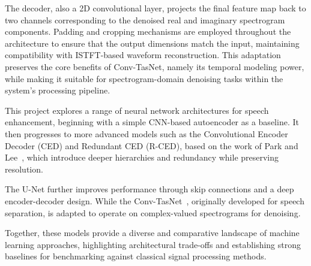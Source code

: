 The decoder, also a 2D convolutional layer, projects the final feature map back to two channels corresponding to the denoised real and imaginary spectrogram components. Padding and cropping mechanisms are employed throughout the architecture to ensure that the output dimensions match the input, maintaining compatibility with ISTFT-based waveform reconstruction. This adaptation preserves the core benefits of Conv-TasNet, namely its temporal modeling power, while making it suitable for spectrogram-domain denoising tasks within the system’s processing pipeline.

\vspace{2em}

This project explores a range of neural network architectures for speech enhancement, beginning with a simple CNN-based autoencoder as a baseline. It then progresses to more advanced models such as the Convolutional Encoder Decoder (CED) and Redundant CED (R-CED), based on the work of Park and Lee~\cite{park2017acoustic}, which introduce deeper hierarchies and redundancy while preserving resolution.

The U-Net further improves performance through skip connections and a deep encoder-decoder design. While the Conv-TasNet~\cite{luo2019conv}, originally developed for speech separation, is adapted to operate on complex-valued spectrograms for denoising.

Together, these models provide a diverse and comparative landscape of machine learning approaches, highlighting architectural trade-offs and establishing strong baselines for benchmarking against classical signal processing methods.



